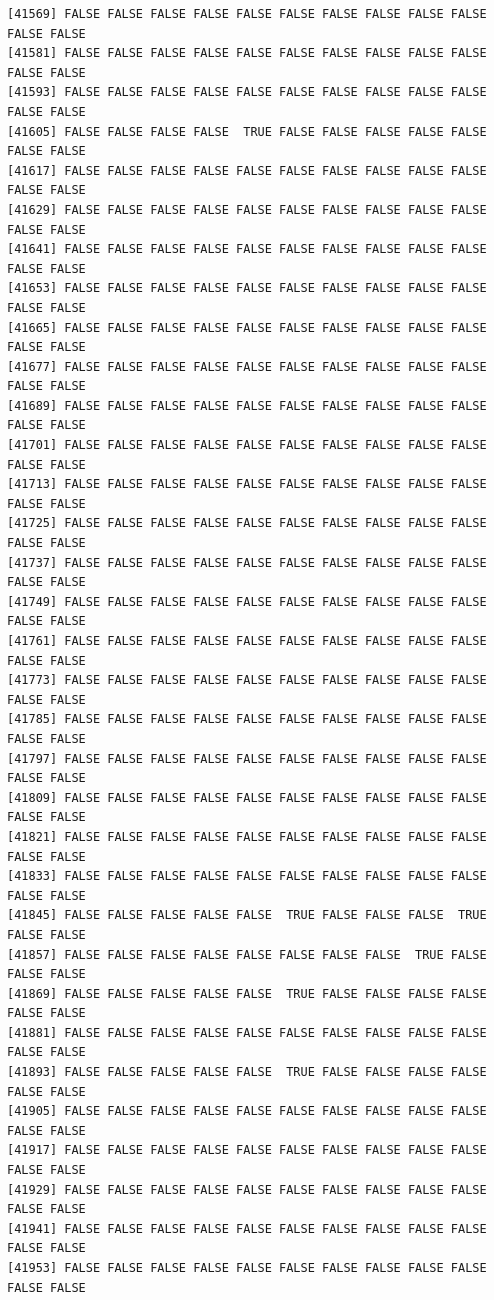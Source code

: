 \documentclass[
  a4paper,
  DIV=11,
  numbers=noendperiod]{scrartcl}
\begin{document}
\begin{verbatim}
[41569] FALSE FALSE FALSE FALSE FALSE FALSE FALSE FALSE FALSE FALSE FALSE FALSE
[41581] FALSE FALSE FALSE FALSE FALSE FALSE FALSE FALSE FALSE FALSE FALSE FALSE
[41593] FALSE FALSE FALSE FALSE FALSE FALSE FALSE FALSE FALSE FALSE FALSE FALSE
[41605] FALSE FALSE FALSE FALSE  TRUE FALSE FALSE FALSE FALSE FALSE FALSE FALSE
[41617] FALSE FALSE FALSE FALSE FALSE FALSE FALSE FALSE FALSE FALSE FALSE FALSE
[41629] FALSE FALSE FALSE FALSE FALSE FALSE FALSE FALSE FALSE FALSE FALSE FALSE
[41641] FALSE FALSE FALSE FALSE FALSE FALSE FALSE FALSE FALSE FALSE FALSE FALSE
[41653] FALSE FALSE FALSE FALSE FALSE FALSE FALSE FALSE FALSE FALSE FALSE FALSE
[41665] FALSE FALSE FALSE FALSE FALSE FALSE FALSE FALSE FALSE FALSE FALSE FALSE
[41677] FALSE FALSE FALSE FALSE FALSE FALSE FALSE FALSE FALSE FALSE FALSE FALSE
[41689] FALSE FALSE FALSE FALSE FALSE FALSE FALSE FALSE FALSE FALSE FALSE FALSE
[41701] FALSE FALSE FALSE FALSE FALSE FALSE FALSE FALSE FALSE FALSE FALSE FALSE
[41713] FALSE FALSE FALSE FALSE FALSE FALSE FALSE FALSE FALSE FALSE FALSE FALSE
[41725] FALSE FALSE FALSE FALSE FALSE FALSE FALSE FALSE FALSE FALSE FALSE FALSE
[41737] FALSE FALSE FALSE FALSE FALSE FALSE FALSE FALSE FALSE FALSE FALSE FALSE
[41749] FALSE FALSE FALSE FALSE FALSE FALSE FALSE FALSE FALSE FALSE FALSE FALSE
[41761] FALSE FALSE FALSE FALSE FALSE FALSE FALSE FALSE FALSE FALSE FALSE FALSE
[41773] FALSE FALSE FALSE FALSE FALSE FALSE FALSE FALSE FALSE FALSE FALSE FALSE
[41785] FALSE FALSE FALSE FALSE FALSE FALSE FALSE FALSE FALSE FALSE FALSE FALSE
[41797] FALSE FALSE FALSE FALSE FALSE FALSE FALSE FALSE FALSE FALSE FALSE FALSE
[41809] FALSE FALSE FALSE FALSE FALSE FALSE FALSE FALSE FALSE FALSE FALSE FALSE
[41821] FALSE FALSE FALSE FALSE FALSE FALSE FALSE FALSE FALSE FALSE FALSE FALSE
[41833] FALSE FALSE FALSE FALSE FALSE FALSE FALSE FALSE FALSE FALSE FALSE FALSE
[41845] FALSE FALSE FALSE FALSE FALSE  TRUE FALSE FALSE FALSE  TRUE FALSE FALSE
[41857] FALSE FALSE FALSE FALSE FALSE FALSE FALSE FALSE  TRUE FALSE FALSE FALSE
[41869] FALSE FALSE FALSE FALSE FALSE  TRUE FALSE FALSE FALSE FALSE FALSE FALSE
[41881] FALSE FALSE FALSE FALSE FALSE FALSE FALSE FALSE FALSE FALSE FALSE FALSE
[41893] FALSE FALSE FALSE FALSE FALSE  TRUE FALSE FALSE FALSE FALSE FALSE FALSE
[41905] FALSE FALSE FALSE FALSE FALSE FALSE FALSE FALSE FALSE FALSE FALSE FALSE
[41917] FALSE FALSE FALSE FALSE FALSE FALSE FALSE FALSE FALSE FALSE FALSE FALSE
[41929] FALSE FALSE FALSE FALSE FALSE FALSE FALSE FALSE FALSE FALSE FALSE FALSE
[41941] FALSE FALSE FALSE FALSE FALSE FALSE FALSE FALSE FALSE FALSE FALSE FALSE
[41953] FALSE FALSE FALSE FALSE FALSE FALSE FALSE FALSE FALSE FALSE FALSE FALSE

\end{verbatim}
\end{document}
